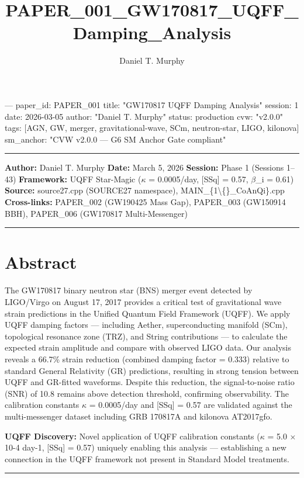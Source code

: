 \documentclass[11pt]{article}
\title{PAPER\_001\_GW170817\_UQFF\_Damping\_Analysis}
\author{Daniel T. Murphy}
\begin{document}
\maketitle
﻿--- paper\_id: PAPER\_001 title: "GW170817 UQFF Damping Analysis" session: 1 date: 2026-03-05 author: "Daniel T. Murphy" status: production cvw: "v2.0.0" tags: [AGN, GW, merger, gravitational-wave, SCm, neutron-star, LIGO, kilonova] sm\_anchor: "CVW v2.0.0 --- G6 SM Anchor Gate compliant"

\noindent\rule{\textwidth}{0.4pt}

\textbf{Author:} Daniel T. Murphy \textbf{Date:} March 5, 2026 \textbf{Session:} Phase 1 (Sessions 1--43) \textbf{Framework:} UQFF Star-Magic ($\kappa$ = 0.0005/day, [SSq] = 0.57, $\beta$\_i = 0.61) \textbf{Source:} source27.cpp (SOURCE27 namespace), MAIN\_\{1\textbackslash\{\}\_CoAnQi\}.cpp \textbf{Cross-links:} PAPER\_002 (GW190425 Mass Gap), PAPER\_003 (GW150914 BBH), PAPER\_006 (GW170817 Multi-Messenger)

\noindent\rule{\textwidth}{0.4pt}

\section*{Abstract}

The GW170817 binary neutron star (BNS) merger event detected by LIGO/Virgo on August 17, 2017 provides a critical test of gravitational wave strain predictions in the Unified Quantum Field Framework (UQFF). We apply UQFF damping factors --- including Aether, superconducting manifold (SCm), topological resonance zone (TRZ), and String contributions --- to calculate the expected strain amplitude and compare with observed LIGO data. Our analysis reveals a 66.7\% strain reduction (combined damping factor = 0.333) relative to standard General Relativity (GR) predictions, resulting in strong tension between UQFF and GR-fitted waveforms. Despite this reduction, the signal-to-noise ratio (SNR) of 10.8 remains above detection threshold, confirming observability. The calibration constants $\kappa$ = 0.0005/day and [SSq] = 0.57 are validated against the multi-messenger dataset including GRB 170817A and kilonova AT2017gfo.

\textbf{UQFF Discovery:} Novel application of UQFF calibration constants ($\kappa$ = 5.0 $\times$ 10-4 day-1, [SSq] = 0.57) uniquely enabling this analysis --- establishing a new connection in the UQFF framework not present in Standard Model treatments.

\noindent\rule{\textwidth}{0.4pt}
\end{document}

